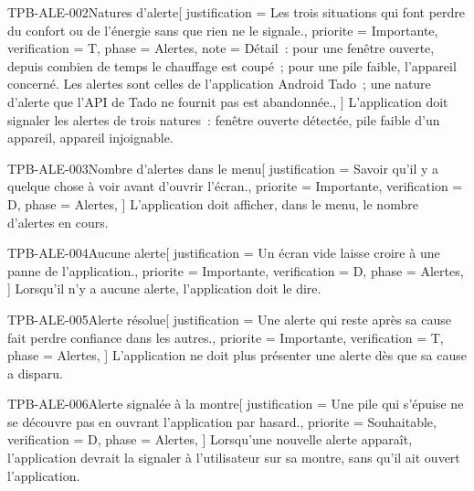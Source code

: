 \begin{exigence}{TPB-ALE-002}{Natures d'alerte}[
    justification = {Les trois situations qui font perdre du confort ou de l'énergie sans
                     que rien ne le signale.},
    priorite      = {Importante},
    verification  = {T},
    phase         = {Alertes},
    note          = {Détail~: pour une fenêtre ouverte, depuis combien de temps le
                     chauffage est coupé~; pour une pile faible, l'appareil concerné. Les
                     alertes sont celles de l'application Android Tado~; une nature d'alerte
                     que l'API de Tado ne fournit pas est abandonnée.},
  ]
  L'application doit signaler les alertes de trois natures~: fenêtre ouverte détectée,
  pile faible d'un appareil, appareil injoignable.
\end{exigence}

\begin{exigence}{TPB-ALE-003}{Nombre d'alertes dans le menu}[
    justification = {Savoir qu'il y a quelque chose à voir avant d'ouvrir l'écran.},
    priorite      = {Importante},
    verification  = {D},
    phase         = {Alertes},
  ]
  L'application doit afficher, dans le menu, le nombre d'alertes en cours.
\end{exigence}

\begin{exigence}{TPB-ALE-004}{Aucune alerte}[
    justification = {Un écran vide laisse croire à une panne de l'application.},
    priorite      = {Importante},
    verification  = {D},
    phase         = {Alertes},
  ]
  Lorsqu'il n'y a aucune alerte, l'application doit le dire.
\end{exigence}

\begin{exigence}{TPB-ALE-005}{Alerte résolue}[
    justification = {Une alerte qui reste après sa cause fait perdre confiance dans les
                     autres.},
    priorite      = {Importante},
    verification  = {T},
    phase         = {Alertes},
  ]
  L'application ne doit plus présenter une alerte dès que sa cause a disparu.
\end{exigence}

\begin{exigence}{TPB-ALE-006}{Alerte signalée à la montre}[
    justification = {Une pile qui s'épuise ne se découvre pas en ouvrant l'application par
                     hasard.},
    priorite      = {Souhaitable},
    verification  = {D},
    phase         = {Alertes},
  ]
  Lorsqu'une nouvelle alerte apparaît, l'application devrait la signaler à l'utilisateur
  sur sa montre, sans qu'il ait ouvert l'application.
\end{exigence}

